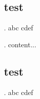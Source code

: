 \documentclass{beamer}
\begin{document}
\subsection{test}
\begin{frame}{.}
    abc
    \pause 
    cdef
\end{frame} 

\begin{frame}{.}
content...
\end{frame}

\subsection{test}
\begin{frame}{.}
    abc
    \pause 
    cdef
\end{frame} 
\end{document}
